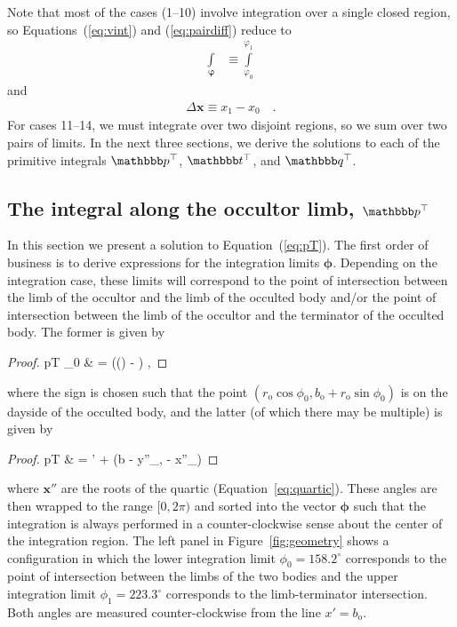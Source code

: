 \documentclass[modern]{aastex62}
\begin{document}
%
Note that most of the cases (1--10) involve integration over a single closed
region, so Equations~(\ref{eq:vint}) and (\ref{eq:pairdiff}) reduce to
%
\begin{align}
    \int\limits_{\pmb{\varphi}} & \equiv
    \int\limits_{\varphi_{0}}^{\varphi_{1}}
\end{align}
%
and
%
\begin{align}
    \Delta \mathbf{x} \equiv x_1 - x_0
    \quad.
\end{align}
%
For cases 11--14, we must integrate over two disjoint regions, so we
sum over two pairs of limits.
%
In the next three sections, we derive the solutions to each of the
primitive integrals $\pT$, $\tT$, and $\qT$.

\subsection{The integral along the occultor limb, $\pT$}
\label{sec:pT}
%
In this section we present a solution to Equation~(\ref{eq:pT}). The first
order of business is to derive expressions for the integration limits
$\pmb{\phi}$. Depending on the integration case, these limits will correspond
to the point of intersection between the limb of the occultor and the
limb of the occulted body and/or the point of intersection between the limb
of the occultor and the terminator of the occulted body.
The former is given by
\citep[c.f. Equation~24 in][]{Luger2019}
%
\begin{proof}{pT}
    \phi_0 & =
     \pm \left(\arcsin\left(\right) - \right)
    \quad,
\end{proof}
%
where the sign is chosen such that the point
$(r_\mathrm{o}\cos\phi_0, b_\mathrm{o} + r_\mathrm{o}\sin\phi_0)$ is on the dayside of the occulted body,
and the latter (of which there may be multiple) is given by
%
\begin{proof}{pT}
     & =
    \theta' +
    \atantwo
    \left(b - y''_,  - x''_\right)
    \quad
\end{proof}
%
where $\mathbf{x''}$ are the roots of the quartic (Equation~\ref{eq:quartic}).
These angles are then wrapped to the range $[0, 2\pi)$
and sorted into the vector $\pmb{\phi}$ such that
the integration is always performed in a counter-clockwise sense about
the center of the integration region.
%
The left panel in Figure~\ref{fig:geometry} shows a configuration in which
the lower integration limit $\phi_0 = 158.2^\circ$ corresponds to the
point of intersection between the limbs of the two bodies and the upper
integration limit $\phi_1 = 223.3^\circ$ corresponds to the
limb-terminator intersection. Both angles are measured counter-clockwise
from the line $x' = b_\mathrm{o}$.
\end{document}
